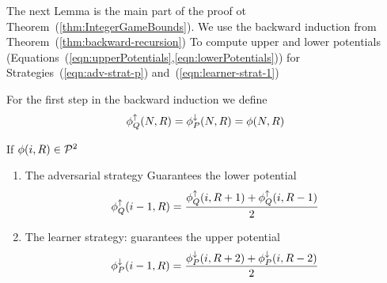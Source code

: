 \documentclass{article}[12pt]
\begin{document}
The next Lemma is the main part of the proof ot
Theorem~(\ref{thm:IntegerGameBounds}). We use the backward induction
from Theorem~(\ref{thm:backward-recursion}) To compute upper and lower
potentials (Equations~(\ref{eqn:upperPotentials},\ref{eqn:lowerPotentials})) for
Strategies~(\ref{eqn:adv-strat-p}) and~(\ref{eqn:learner-strat-1})

For the first step in the backward induction we define
$$  \phi_{Q}^{\uparrow}(N,R) = \phi_{P}^{\downarrow}(N,R) = \phi(N,R) $$

\begin{lemma} \label{lemma:first-order-bound}
  If $\phi(i,R) \in {\cal P}^{2}$
  \begin{enumerate}
    \item The adversarial strategy
    Guarantees the lower potential
 \begin{equation} \label{eqn:value-iteration-lower}
   \phi_{Q}^{\uparrow}(i-1, R) = \frac{\phi_{Q}^{\uparrow}(i,R+1) + \phi_{Q}^{\uparrow}(i,R-1)}{2}
 \end{equation}
   
    \item The learner strategy:
      guarantees the upper potential 
      \begin{equation} \label{eqn:value-iteration-upper-recursion}
        \phi_{P}^{\downarrow}(i-1, R) = \frac{\phi_{P}^{\downarrow}(i,R+2) + \phi_{P}^{\downarrow}(i,R-2)}{2}
      \end{equation}
    \end{enumerate}
    
\end{lemma}
\end{document}
